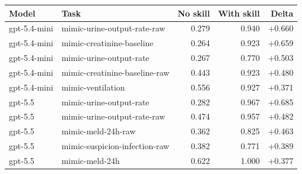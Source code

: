 \begin{tabular}{llrrr}
\toprule
Model & Task & No skill & With skill & Delta \\
\midrule
gpt-5.4-mini & mimic-urine-output-rate-raw & 0.279 & 0.940 & +0.660 \\
gpt-5.4-mini & mimic-creatinine-baseline & 0.264 & 0.923 & +0.659 \\
gpt-5.4-mini & mimic-urine-output-rate & 0.267 & 0.770 & +0.503 \\
gpt-5.4-mini & mimic-creatinine-baseline-raw & 0.443 & 0.923 & +0.480 \\
gpt-5.4-mini & mimic-ventilation & 0.556 & 0.927 & +0.371 \\
gpt-5.5 & mimic-urine-output-rate & 0.282 & 0.967 & +0.685 \\
gpt-5.5 & mimic-urine-output-rate-raw & 0.474 & 0.957 & +0.482 \\
gpt-5.5 & mimic-meld-24h-raw & 0.362 & 0.825 & +0.463 \\
gpt-5.5 & mimic-suspicion-infection-raw & 0.382 & 0.771 & +0.389 \\
gpt-5.5 & mimic-meld-24h & 0.622 & 1.000 & +0.377 \\
\bottomrule
\end{tabular}
